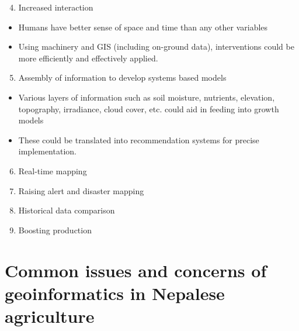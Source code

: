 \documentclass[11pt,dvipsnames,ignorenonframetext,aspectratio=169]{beamer}
\providecommand{\tightlist}{%
  \setlength{\itemsep}{0pt}\setlength{\parskip}{0pt}}
\begin{document}
\begin{frame}{}
\protect\hypertarget{section-8}{}
\begin{enumerate}
\setcounter{enumi}{3}
\tightlist
\item
  Increased interaction
\end{enumerate}

\begin{itemize}
\tightlist
\item
  Humans have better sense of space and time than any other variables
\item
  Using machinery and GIS (including on-ground data), interventions
  could be more efficiently and effectively applied.
\end{itemize}

\begin{enumerate}
\setcounter{enumi}{4}
\tightlist
\item
  Assembly of information to develop systems based models
\end{enumerate}

\begin{itemize}
\tightlist
\item
  Various layers of information such as soil moisture, nutrients,
  elevation, topography, irradiance, cloud cover, etc. could aid in
  feeding into growth models
\item
  These could be translated into recommendation systems for precise
  implementation.
\end{itemize}
\end{frame}

\begin{frame}{}
\protect\hypertarget{section-9}{}
\begin{enumerate}
\setcounter{enumi}{5}
\tightlist
\item
  Real-time mapping
\item
  Raising alert and disaster mapping
\item
  Historical data comparison
\item
  Boosting production
\end{enumerate}
\end{frame}

\hypertarget{common-issues-and-concerns-of-geoinformatics-in-nepalese-agriculture}{%
\section{Common issues and concerns of geoinformatics in Nepalese
agriculture}\label{common-issues-and-concerns-of-geoinformatics-in-nepalese-agriculture}}
\end{document}

